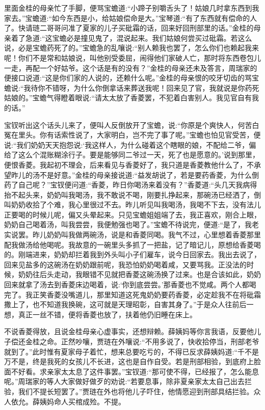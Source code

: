 \begin{parag}
    里面金桂的母亲忙了手脚，便骂宝蟾道:“小蹄子别嚼舌头了！姑娘几时拿东西到我家去。”宝蟾道:“如今东西是小，给姑娘偿命是大。”宝琴道:“有了东西就有偿命的人了。快请琏二哥哥问准了夏家的儿子买砒霜的话，回来好回刑部里的话。”金桂的母亲着了急道:“这宝蟾必是撞见鬼了，混说起来。我们姑娘何尝买过砒霜。若这么说，必是宝蟾药死了的。”宝蟾急的乱嚷说:“别人赖我也罢了，怎么你们也赖起我来呢！你们不是常和姑娘说，叫他别受委屈，闹得他们家破人亡，那时将东西卷包儿一走，再配一个好姑爷。这个话是有的没有？”金桂的母亲还未及答言，周瑞家的便接口说道:“这是你们家的人说的，还赖什么呢。”金桂的母亲恨的咬牙切齿的骂宝蟾说:“我待你不错呀，为什么你倒拿话来葬送我呢！回来见了官，我就说是你药死姑娘的。”宝蟾气得瞪着眼说:“请太太放了香菱罢，不犯着白害别人。我见官自有我的话。”
\end{parag}


\begin{parag}
    宝钗听出这个话头儿来了，便叫人反倒放开了宝蟾，说:“你原是个爽快人，何苦白冤在里头。你有话索性说了，大家明白，岂不完了事了呢。”宝蟾也怕见官受苦，便说:“我们奶奶天天抱怨说:‘我这样人，为什么碰着这个瞎眼的娘，不配给二爷，偏给了这么个混账糊涂行子。要是能够同二爷过一天，死了也是愿意的。’说到那里，便恨香菱。我起初不理会，后来看见与香菱好了，我只道是香菱教他什么了，不承望昨儿的汤不是好意。”金桂的母亲接说道:“益发胡说了，若是要药香菱，为什么倒药了自己呢？”宝钗便问道:“香菱，昨日你喝汤来着没有？”香菱道:“头几天我病得抬不起头来，奶奶叫我喝汤，我不敢说不喝，刚要扎挣起来，那碗汤已经洒了，倒叫奶奶收拾了个难，我心里很过不去。昨儿听见叫我喝汤，我喝不下去，没有法儿正要喝的时候儿呢，偏又头晕起来。只见宝蟾姐姐端了去，我正喜欢，刚合上眼，奶奶自己喝着汤，叫我尝尝，我便勉强也喝了。”宝蟾不待说完，便道:“是了，我老实说罢。昨儿奶奶叫我做两碗汤，说是和香菱同喝。我气不过，心里想着香菱那里配我做汤给他喝呢。我故意的一碗里头多抓了一把盐，记了暗记儿，原想给香菱喝的。刚端进来，奶奶却拦着我到外头叫小子们雇车，说今日回家去。我出去说了，回来见盐多的这碗汤在奶奶跟前呢，我恐怕奶奶喝着咸，又要骂我。正没法的时候，奶奶往后头走动，我眼错不见就把香菱这碗汤换了过来。也是合该如此，奶奶回来就拿了汤去到香菱床边喝着，说:‘你到底尝尝。’那香菱也不觉咸。两个人都喝完了。我正笑香菱没嘴道儿，那里知道这死鬼奶奶要药香菱，必定趁我不在将砒霜撒上了，也不知道我换碗，这可就是天理昭彰，自害其身了。”于是众人往前后一想，真正一丝不错，便将香菱也放了，扶着他仍旧睡在床上。
\end{parag}


\begin{parag}
    不说香菱得放，且说金桂母亲心虚事实，还想辩赖。薛姨妈等你言我语，反要他儿子偿还金桂之命。正然吵嚷，贾琏在外嚷说:“不用多说了，快收拾停当，刑部老爷就到了。”此时惟有夏家母子着忙，想来总要吃亏的，不得已反求薛姨妈道:“千不是万不是，终是我死的女孩儿不长进，这也是自作自受。若是刑部相验，到底府上脸面不好看。求亲家太太息了这件事罢。”宝钗道:“那可使不得，已经报了，怎么能息呢。”周瑞家的等人大家做好做歹的劝说:“若要息事，除非夏亲家太太自己出去拦验，我们不提长短罢了。”贾琏在外也将他儿子吓住，他情愿迎到刑部具结拦验。众人依允。薛姨妈命人买棺成殓。不提。
\end{parag}


